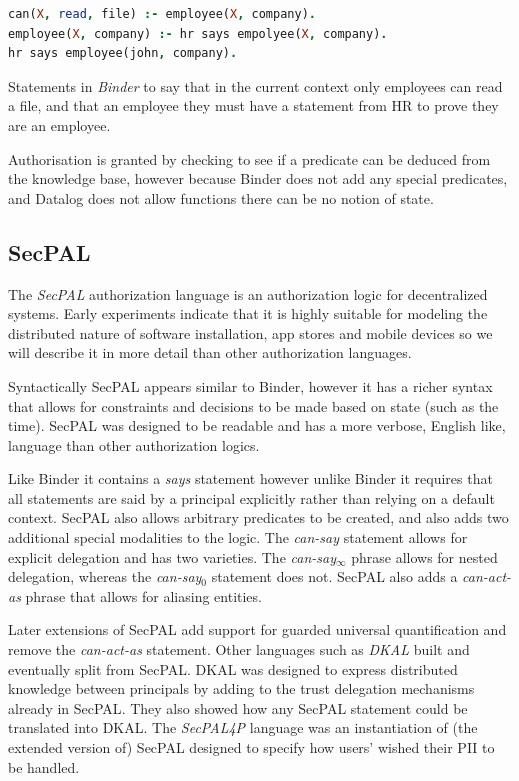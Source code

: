 \documentclass[report.tex]{subfiles}
\begin{document}
\begin{marginfigure}\label{code:binder}
  \begin{lstlisting}[language=Prolog,morekeywords={*,says,:-},basicstyle=\scriptsize]
can(X, read, file) :- employee(X, company). 
employee(X, company) :- hr says empolyee(X, company).
hr says employee(john, company).
  \end{lstlisting}
  \caption{Statements in \emph{Binder} to say that in the current context only
    employees can read a file, and that an employee they must have a statement
    from HR to prove they are an employee.}
\end{marginfigure}

Authorisation is granted by checking to see if a predicate can be deduced from
the knowledge base, however because Binder does not add any special predicates,
and Datalog does not allow functions there can be no notion of state.

\subsection{{SecPAL}}

The \emph{{SecPAL}} authorization language\cite{Becker:2006vh} is an authorization
logic for decentralized systems.  Early experiments indicate that it is highly
suitable for modeling the distributed nature of software installation, app
stores and mobile devices so we will describe it in more detail than other
authorization languages.

Syntactically {SecPAL} appears similar to Binder, however it has a richer syntax
that allows for constraints and decisions to be made based on state (such as the
time).  {SecPAL} was designed to be readable and has a more verbose, English like,
language than other authorization logics. 

Like Binder it contains a \emph{says} statement however unlike Binder it
requires that all statements are said by a principal explicitly rather than
relying on a default context.  {SecPAL} also allows arbitrary predicates to be
created, and also adds two additional special modalities to the logic.  The
\emph{can-say} statement allows for explicit delegation and has two varieties.
The \emph{can-say$_\infty$} phrase allows for nested delegation, whereas the
\emph{can-say$_0$} statement does not.  {SecPAL} also adds a \emph{can-act-as}
phrase that allows for aliasing entities.

Later extensions of {SecPAL}\cite{Becker:2009vt} add support for guarded
universal quantification and remove the \emph{can-act-as} statement.  Other
languages such as \emph{DKAL}\cite{Gurevich:2008fz} built and eventually split
from {SecPAL}.  DKAL was designed to express distributed knowledge between
principals by adding to the trust delegation mechanisms already in {SecPAL}.
They also showed how any {SecPAL} statement could be translated into {DKAL}.
The \emph{{SecPAL}4P} language\cite{Becker:2009ula} was an instantiation of (the
extended version of) {SecPAL} designed to specify how users' wished their
\ac{PII} to be handled.
\end{document}
